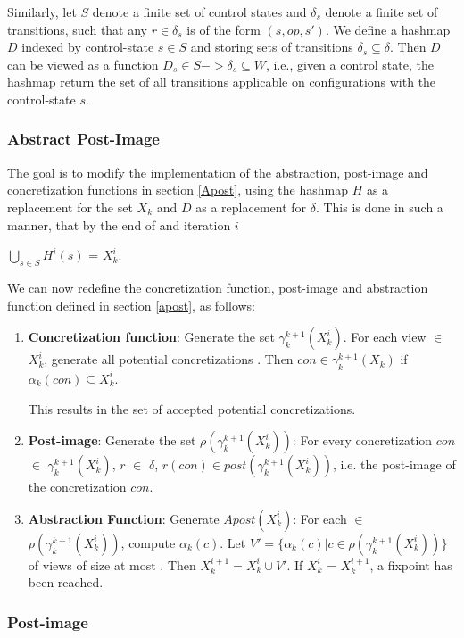 Similarly, let $S$ denote a finite set of control states and $\delta_s$ denote a finite set of transitions, such that any $r \in \delta_s$ is of the form $(s, op, s')$. We define a hashmap $D$ indexed by control-state $s \in S$ and storing sets of transitions $\delta_s \subseteq \delta$. Then $D$ can be viewed as a function $D_ s \in S -> \delta_s \subseteq W$, i.e., given a control state, the hashmap return the set of all transitions applicable on configurations with the control-state $s$.

\subsubsection{Abstract Post-Image}
The goal is to modify the implementation of the abstraction, post-image and concretization functions in section \ref{Apost}, using the hashmap $H$ as a replacement for the set $X_k$ and $D$ as a replacement for $\delta$. This is done in such a manner, that by the end of and iteration $i$

$\bigcup\limits_{s \in S} H^i(s)$ = $X_k^i$.

We can now redefine the concretization function, post-image and abstraction function defined in section \ref{apost}, as follows:

\begin{enumerate}
\item
\textbf{Concretization function}:
Generate the set $\gamma_k^{k+1}(X_k^i)$. For each view  $\in$ $X_k^i$, generate all potential concretizations . Then $con \in \gamma_k^{k+1}(X_k)$ if $\alpha_k(con) \subseteq X_k^i$.

This results in the set of accepted potential concretizations.

\item
\textbf{Post-image}:
Generate the set $\rho(\gamma_k^{k+1}(X_k^i))$: For every concretization $con$ $\in$ $\gamma_k^{k+1}(X_k^i)$, $r$ $\in$ $\delta$, $r(con) \in post(\gamma_k^{k+1}(X_k^i))$, i.e. the post-image of the concretization $con$.

\item
\textbf{Abstraction Function}:
Generate $Apost(X_k^i)$: For each  $\in$ $\rho(\gamma_k^{k+1}(X_k^i))$, compute $\alpha_k(c)$. Let $V' = \{\alpha_k(c)|c \in \rho(\gamma_k^{k+1}(X_k^i))\}$ of views of size at most . Then $X_k^{i+1} = X_k^i \cup V'$. If $X_k^i$ = $X_k^{i+1}$, a fixpoint has been reached.
\end{enumerate}

\subsubsection{Post-image}

